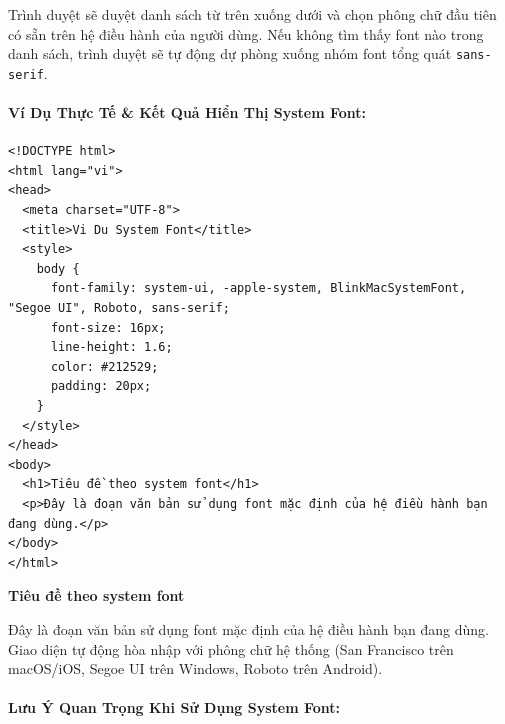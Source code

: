 \documentclass[11pt,oneside]{book}
\newcommand{\codeinline}[1]{\textcolor{accentOrange}{\texttt{#1}}}
\begin{document}
\begin{tipBox}
Trình duyệt sẽ duyệt danh sách từ trên xuống dưới và chọn phông chữ đầu tiên có sẵn trên hệ điều hành của người dùng. Nếu không tìm thấy font nào trong danh sách, trình duyệt sẽ tự động dự phòng xuống nhóm font tổng quát \codeinline{sans-serif}.
\end{tipBox}

\paragraph{Ví Dụ Thực Tế \& Kết Quả Hiển Thị System Font:}

\begin{codeWindow}
\begin{lstlisting}[language=HTML5]
<!DOCTYPE html>
<html lang="vi">
<head>
  <meta charset="UTF-8">
  <title>Vi Du System Font</title>
  <style>
    body {
      font-family: system-ui, -apple-system, BlinkMacSystemFont, "Segoe UI", Roboto, sans-serif;
      font-size: 16px;
      line-height: 1.6;
      color: #212529;
      padding: 20px;
    }
  </style>
</head>
<body>
  <h1>Tiêu đề theo system font</h1>
  <p>Đây là đoạn văn bản sử dụng font mặc định của hệ điều hành bạn đang dùng.</p>
</body>
</html>
\end{lstlisting}
\end{codeWindow}

\begin{browserWindow}
\sffamily\small
\begin{tcolorbox}[arc=4pt, colback=white, colframe=primaryBlue!30, boxrule=0.8pt, top=12pt, bottom=12pt, left=14pt, right=14pt]
  {\fontsize{18}{22}\selectfont\bfseries\color{primaryBlue} Tiêu đề theo system font} \par\vspace{6pt}
  {\fontsize{12}{16}\selectfont Đây là đoạn văn bản sử dụng font mặc định của hệ điều hành bạn đang dùng. Giao diện tự động hòa nhập với phông chữ hệ thống (San Francisco trên macOS/iOS, Segoe UI trên Windows, Roboto trên Android).}
\end{tcolorbox}
\end{browserWindow}

\paragraph{Lưu Ý Quan Trọng Khi Sử Dụng System Font:}
\end{document}
